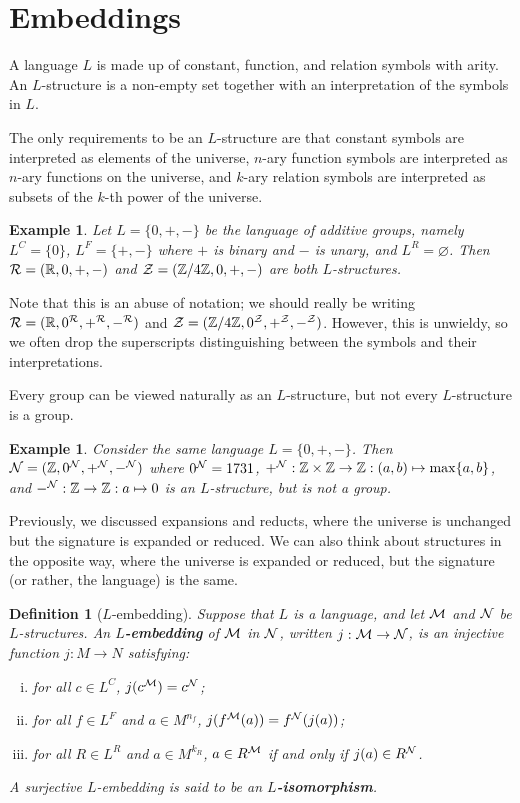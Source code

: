 \documentclass[10pt]{article}
\newcommand{\R}{\mathbb{R}}
\newcommand{\Z}{\mathbb{Z}}
\theoremstyle{newstyle}
\newtheorem{defn}[thm]{Definition}
\newtheorem{exmp}[thm]{Example}
\begin{document}
 
\newpage\section{Embeddings}
A language $L$ is made up of constant, function, and relation symbols with arity. 
An $L$-structure is a non-empty set together with an interpretation of the symbols in $L$. 

The only requirements to be an $L$-structure are that constant symbols are interpreted as 
elements of the universe, $n$-ary function symbols are interpreted as $n$-ary functions on the 
universe, and $k$-ary relation symbols are interpreted as subsets of the $k$-th power 
of the universe. 

\begin{exmp}
Let $L = \{0, +, -\}$ be the language of additive groups, namely $L^C = \{0\}$, 
$L^F = \{+, -\}$ where $+$ is binary and $-$ is unary, and $L^R = \varnothing$. 
Then ${\cal R} = (\R, 0, +, -)$ and ${\cal Z} = (\Z/4\Z, 0, +, -)$ are both $L$-structures.
\end{exmp}

Note that this is an abuse of notation; we should really be writing ${\cal R} = (\R, 0^{\cal R}, +^{\cal R}, -^{\cal R})$ and ${\cal Z} = (\Z/4\Z, 0^{\cal Z}, +^{\cal Z}, -^{\cal Z})$. However, 
this is unwieldy, so we often drop the superscripts distinguishing between the symbols 
and their interpretations.

Every group can be viewed naturally as an $L$-structure, but not every $L$-structure is a group. 

\begin{exmp}
Consider the same language $L = \{0, +, -\}$. Then ${\cal N} = (\Z, 0^{\cal N}, 
+^{\cal N}, -^{\cal N})$ where $0^{\cal N} = 1731$, $+^{\cal N} : \Z \times \Z \to \Z : 
(a, b) \mapsto \max\{a, b\}$, and $-^{\cal N} : \Z \to \Z : a \mapsto 0$ is an 
$L$-structure, but is not a group.
\end{exmp}

Previously, we discussed expansions and reducts, where the universe is unchanged 
but the signature is expanded or reduced. We can also think about structures in the opposite way, 
where the universe is expanded or reduced, but the signature (or rather, the language) 
is the same.

\begin{defn}[$L$-embedding]
Suppose that $L$ is a language, and let ${\cal M}$ and ${\cal N}$ be $L$-structures. 
An {\bf $L$-embedding} of ${\cal M}$ in ${\cal N}$, written $j : {\cal M} \to {\cal N}$, is an injective function 
$j : M \to N$ satisfying:
\begin{enumerate}[(i)]
    \item for all $c \in L^C$, $j(c^{\cal M}) = c^{\cal N}$;
    \item for all $f \in L^F$ and $a \in M^{n_f}$, $j(f^{\cal M}(a)) = f^{\cal N}(j(a))$; 
    \item for all $R \in L^R$ and $a \in M^{k_R}$, $a \in R^{\cal M}$ if and only if 
    $j(a) \in R^{\cal N}$.
\end{enumerate}
A surjective $L$-embedding is said to be an {\bf $L$-isomorphism}.
\end{defn}
\end{document}
